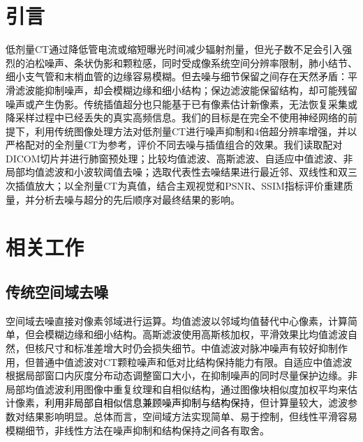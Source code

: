 \documentclass[10.5pt,compsoc,UTF8]{CjC}
\newcommand{\added}[1]{\textcolor{black}{#1}}
\newcommand{\redcite}[1]{{\color{black}\cite{#1}}}
\theoremstyle{mystyle}
\begin{document}
\vskip 10mm


\section{\heiti 引言}
低剂量CT通过降低管电流或缩短曝光时间减少辐射剂量，但光子数不足会引入强烈的泊松噪声、条状伪影和颗粒感\redcite{yu2009dose}，同时受成像系统空间分辨率限制，肺小结节、细小支气管和末梢血管的边缘容易模糊。但去噪与细节保留之间存在天然矛盾：平滑滤波能抑制噪声，却会模糊边缘和细小结构；保边滤波能保留结构，却可能残留噪声或产生伪影。传统插值超分也只能基于已有像素估计新像素，无法恢复采集或降采样过程中已经丢失的真实高频信息\redcite{gonzalez2018digital,keys1981cubic}。我们的目标是在完全不使用神经网络的前提下，利用传统图像处理方法对低剂量CT进行噪声抑制和4倍超分辨率增强，并以严格配对的全剂量CT为参考，评价不同去噪与插值组合的效果。我们读取配对DICOM切片并进行肺窗预处理；比较均值滤波、高斯滤波、自适应中值滤波、非局部均值滤波和小波软阈值去噪；选取代表性去噪结果进行最近邻、双线性和双三次插值放大；以全剂量CT为真值，结合主观视觉和PSNR、SSIM指标评价重建质量，并分析去噪与超分的先后顺序对最终结果的影响。
\section{\heiti 相关工作}
\subsection{传统空间域去噪}
空间域去噪直接对像素邻域进行运算。均值滤波以邻域均值替代中心像素，计算简单，但会模糊边缘和细小结构。高斯滤波使用高斯核加权，平滑效果比均值滤波自然，但核尺寸和标准差增大时仍会损失细节\redcite{gonzalez2018digital}。中值滤波对脉冲噪声有较好抑制作用，但普通中值滤波对CT颗粒噪声和低对比结构保持能力有限。自适应中值滤波根据局部窗口内灰度分布动态调整窗口大小，在抑制噪声的同时尽量保护边缘\redcite{hwang1995adaptive}。非局部均值滤波利用图像中重复纹理和自相似结构，通过图像块相似度加权平均来估计像素，\added{利用非局部自相似信息兼顾噪声抑制与结构保持}，但计算量较大，滤波参数对结果影响明显\redcite{buades2005nlm}。总体而言，空间域方法实现简单、易于控制，但线性平滑容易模糊细节，非线性方法在噪声抑制和结构保持之间各有取舍。
\end{document}
